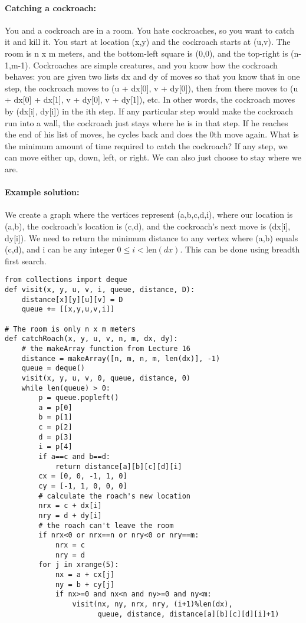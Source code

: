 \documentclass[11pt]{article}
\begin{document}
\paragraph{\Large Catching a cockroach:}
You and a cockroach are in a room. You hate cockroaches, so you want
to catch it and kill it.  You start at location (x,y) and the
cockroach starts at (u,v).  
The room is n x m meters, and the bottom-left square is (0,0), and the
top-right is (n-1,m-1).
Cockroaches are simple creatures, and you
know how the cockroach behaves: you are given two lists dx and dy of
moves so
that you know that in one step, the cockroach moves to (u + dx[0], v +
dy[0]), then from there moves to (u + dx[0] + dx[1], v + dy[0], v +
dy[1]), etc.  In other words, the cockroach moves by (dx[i], dy[i]) in
the ith step.  If any particular step would make the cockroach run
into a wall, the cockroach just stays where he is in that step.  If he
reaches the end of his list of moves, he cycles back and does the 0th
move again.  What is the minimum amount of time required to catch the
cockroach? If any step, we can move either up, down, left, or right.
We can also just choose to stay where we are.

\paragraph{Example solution:}
We create a graph where the vertices represent (a,b,c,d,i), where our
location is (a,b), the cockroach's location is (c,d), and the
cockroach's next move is (dx[i], dy[i]).  We need to return the
minimum distance to any vertex where (a,b) equals (c,d), and i can be
any integer $0\le i < \mathrm{len}(dx)$.  This can be done using
breadth first search.

\begin{verbatim}
from collections import deque
def visit(x, y, u, v, i, queue, distance, D):
    distance[x][y][u][v] = D
    queue += [[x,y,u,v,i]]

# The room is only n x m meters
def catchRoach(x, y, u, v, n, m, dx, dy):
    # the makeArray function from Lecture 16
    distance = makeArray([n, m, n, m, len(dx)], -1)
    queue = deque()
    visit(x, y, u, v, 0, queue, distance, 0)
    while len(queue) > 0:
        p = queue.popleft()
        a = p[0]
        b = p[1]
        c = p[2]
        d = p[3]
        i = p[4]
        if a==c and b==d:
            return distance[a][b][c][d][i]
        cx = [0, 0, -1, 1, 0]
        cy = [-1, 1, 0, 0, 0]
        # calculate the roach's new location
        nrx = c + dx[i]
        nry = d + dy[i]
        # the roach can't leave the room
        if nrx<0 or nrx==n or nry<0 or nry==m:
            nrx = c
            nry = d
        for j in xrange(5):
            nx = a + cx[j]
            ny = b + cy[j]
            if nx>=0 and nx<n and ny>=0 and ny<m:
                visit(nx, ny, nrx, nry, (i+1)%len(dx),
                      queue, distance, distance[a][b][c][d][i]+1)
\end{verbatim}
\end{document}
